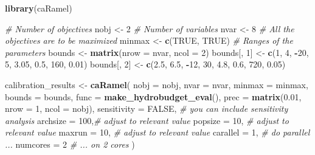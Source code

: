 \documentclass[
]{book}
\newenvironment{Shaded}{\begin{snugshade}}{\end{snugshade}}
\newcommand{\AttributeTok}[1]{\textcolor[rgb]{0.13,0.29,0.53}{#1}}
\newcommand{\CommentTok}[1]{\textcolor[rgb]{0.56,0.35,0.01}{\textit{#1}}}
\newcommand{\ConstantTok}[1]{\textcolor[rgb]{0.56,0.35,0.01}{#1}}
\newcommand{\DecValTok}[1]{\textcolor[rgb]{0.00,0.00,0.81}{#1}}
\newcommand{\FloatTok}[1]{\textcolor[rgb]{0.00,0.00,0.81}{#1}}
\newcommand{\FunctionTok}[1]{\textcolor[rgb]{0.13,0.29,0.53}{\textbf{#1}}}
\newcommand{\NormalTok}[1]{#1}
\newcommand{\OtherTok}[1]{\textcolor[rgb]{0.56,0.35,0.01}{#1}}
\newcommand{\SpecialCharTok}[1]{\textcolor[rgb]{0.81,0.36,0.00}{\textbf{#1}}}
\begin{document}
\begin{Shaded}
\begin{Highlighting}[]
\FunctionTok{library}\NormalTok{(caRamel)}

\CommentTok{\# Number of objectives}
\NormalTok{nobj }\OtherTok{\textless{}{-}} \DecValTok{2}
\CommentTok{\# Number of variables}
\NormalTok{nvar }\OtherTok{\textless{}{-}} \DecValTok{8}
\CommentTok{\# All the objectives are to be maximized}
\NormalTok{minmax }\OtherTok{\textless{}{-}} \FunctionTok{c}\NormalTok{(}\ConstantTok{TRUE}\NormalTok{, }\ConstantTok{TRUE}\NormalTok{)}
\CommentTok{\# Ranges of the parameters}
\NormalTok{bounds }\OtherTok{\textless{}{-}} \FunctionTok{matrix}\NormalTok{(}\AttributeTok{nrow =}\NormalTok{ nvar, }\AttributeTok{ncol =} \DecValTok{2}\NormalTok{)}
\NormalTok{bounds[, }\DecValTok{1}\NormalTok{] }\OtherTok{\textless{}{-}} \FunctionTok{c}\NormalTok{(}\DecValTok{1}\NormalTok{, }\DecValTok{4}\NormalTok{, }\SpecialCharTok{{-}}\DecValTok{20}\NormalTok{, }\DecValTok{5}\NormalTok{, }\FloatTok{3.05}\NormalTok{, }\FloatTok{0.5}\NormalTok{, }\DecValTok{160}\NormalTok{, }\FloatTok{0.01}\NormalTok{)}
\NormalTok{bounds[, }\DecValTok{2}\NormalTok{] }\OtherTok{\textless{}{-}} \FunctionTok{c}\NormalTok{(}\FloatTok{2.5}\NormalTok{, }\FloatTok{6.5}\NormalTok{, }\SpecialCharTok{{-}}\DecValTok{12}\NormalTok{, }\DecValTok{30}\NormalTok{, }\FloatTok{4.8}\NormalTok{, }\FloatTok{0.6}\NormalTok{, }\DecValTok{720}\NormalTok{, }\FloatTok{0.05}\NormalTok{)}

\NormalTok{calibration\_results }\OtherTok{\textless{}{-}} \FunctionTok{caRamel}\NormalTok{(}
  \AttributeTok{nobj =}\NormalTok{ nobj,}
  \AttributeTok{nvar =}\NormalTok{ nvar,}
  \AttributeTok{minmax =}\NormalTok{  minmax,}
  \AttributeTok{bounds =}\NormalTok{ bounds,}
  \AttributeTok{func =} \FunctionTok{make\_hydrobudget\_eval}\NormalTok{(),}
  \AttributeTok{prec =} \FunctionTok{matrix}\NormalTok{(}\FloatTok{0.01}\NormalTok{, }\AttributeTok{nrow =} \DecValTok{1}\NormalTok{, }\AttributeTok{ncol =}\NormalTok{ nobj),}
  \AttributeTok{sensitivity =} \ConstantTok{FALSE}\NormalTok{, }\CommentTok{\# you can include sensitivity analysis}
  \AttributeTok{archsize =} \DecValTok{100}\NormalTok{,}\CommentTok{\# adjust to relevant value}
  \AttributeTok{popsize =} \DecValTok{10}\NormalTok{,  }\CommentTok{\# adjust to relevant value}
  \AttributeTok{maxrun =} \DecValTok{10}\NormalTok{,   }\CommentTok{\# adjust to relevant value}
  \AttributeTok{carallel =} \DecValTok{1}\NormalTok{, }\CommentTok{\# do parallel ...}
  \AttributeTok{numcores =} \DecValTok{2}  \CommentTok{\# ... on 2 cores}
\NormalTok{)}
\end{Highlighting}
\end{Shaded}
\end{document}
